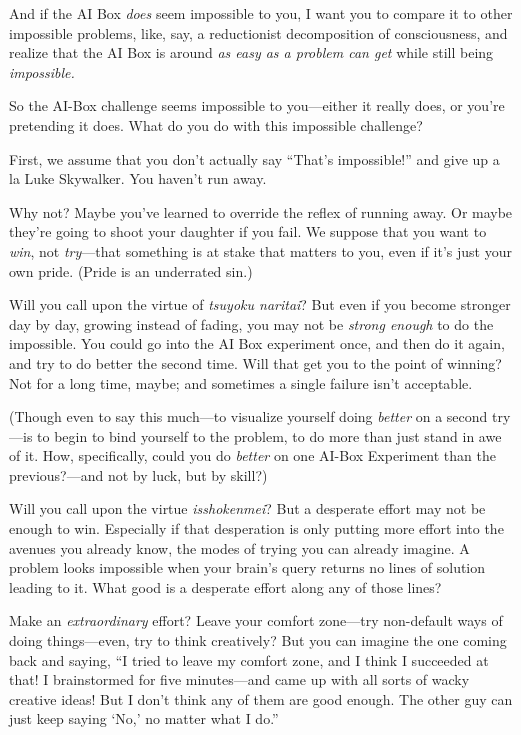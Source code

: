 {
 And if the AI Box \textit{does} seem impossible to you, I want you
to compare it to other impossible problems, like, say, a reductionist
decomposition of consciousness, and realize that the AI Box is around
\textit{as easy as a problem can get} while still being
\textit{impossible.}}

{
 So the AI-Box challenge seems impossible to you---either it really
does, or you're pretending it does. What do you do with
this impossible challenge?}

{
 First, we assume that you don't actually say
``That's
impossible!'' and give up a la Luke Skywalker. You
haven't run away.}

{
 Why not? Maybe you've learned to override the
reflex of running away. Or maybe they're going to shoot
your daughter if you fail. We suppose that you want to \textit{win},
not \textit{try}{}---that something is at stake that matters to you,
even if it's just your own pride. (Pride is an
underrated sin.)}

{
 Will you call upon the virtue of \textit{tsuyoku naritai}? But
even if you become stronger day by day, growing instead of fading, you
may not be \textit{strong enough} to do the impossible. You could go
into the AI Box experiment once, and then do it again, and try to do
better the second time. Will that get you to the point of winning? Not
for a long time, maybe; and sometimes a single failure
isn't acceptable.}

{
 (Though even to say this much---to visualize yourself doing
\textit{better} on a second try---is to begin to bind yourself to the
problem, to do more than just stand in awe of it. How, specifically,
could you do \textit{better} on one AI-Box Experiment than the
previous?---and not by luck, but by skill?)}

{
 Will you call upon the virtue \textit{isshokenmei}? But a
desperate effort may not be enough to win. Especially if that
desperation is only putting more effort into the avenues you already
know, the modes of trying you can already imagine. A problem looks
impossible when your brain's query returns no lines of
solution leading to it. What good is a desperate effort along any of
those lines?}

{
 Make an \textit{extraordinary} effort? Leave your comfort
zone---try non-default ways of doing things---even, try to think
creatively? But you can imagine the one coming back and saying,
``I tried to leave my comfort zone, and I think I
succeeded at that! I brainstormed for five minutes---and came up with
all sorts of wacky creative ideas! But I don't think
any of them are good enough. The other guy can just keep saying
`No,' no matter what I
do.''}

